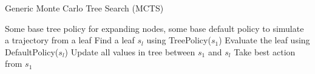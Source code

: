 \begin{algorithm}[t!]
\caption{Generic Monte Carlo Tree Search (MCTS)}
\begin{algorithmic}[1]
\label{alg:mcts}
\REQUIRE Some base tree policy for expanding nodes, some base default policy to simulate a trajectory from a leaf
    \STATE Find a leaf $s_l$ using TreePolicy($s_1$)
    \STATE Evaluate the leaf using DefaultPolicy($s_l$)
    \STATE Update all values in tree between $s_1$ and $s_l$
\ENDWHILE
Take best action from $s_1$
\end{algorithmic}
\end{algorithm}